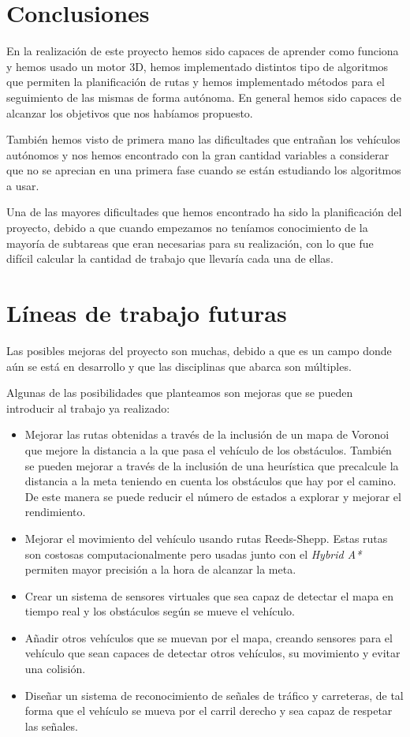 
\section{Conclusiones}
En la realización de este proyecto hemos sido capaces de aprender como funciona y hemos usado un motor 3D, hemos implementado distintos tipo de algoritmos que permiten la planificación de rutas y hemos implementado métodos para el seguimiento de las mismas de forma autónoma. En general hemos sido capaces de alcanzar los objetivos que nos habíamos propuesto.

También hemos visto de primera mano las dificultades que entrañan los vehículos autónomos y nos hemos encontrado con la gran cantidad variables a considerar que no se aprecian en una primera fase cuando se están estudiando los algoritmos a usar.

Una de las mayores dificultades que hemos encontrado ha sido la planificación del proyecto, debido a que cuando empezamos no teníamos conocimiento de la mayoría de subtareas que eran necesarias para su realización, con lo que fue difícil calcular la cantidad de trabajo que llevaría cada una de ellas.

\section{Líneas de trabajo futuras}
Las posibles mejoras del proyecto son muchas, debido a que es un campo donde aún se está en desarrollo y que las disciplinas que abarca son múltiples.

Algunas de las posibilidades que planteamos son mejoras que se pueden introducir al trabajo ya realizado:
\begin{itemize}
\item Mejorar las rutas obtenidas a través de la inclusión de un mapa de Voronoi\cite{wiki:voronoi} que mejore la distancia a la que pasa el vehículo de los obstáculos. También se pueden mejorar a través de la inclusión de una heurística que precalcule la distancia a la meta teniendo en cuenta los obstáculos que hay por el camino. De este manera se puede reducir el número de estados a explorar y mejorar el rendimiento.
\item Mejorar el movimiento del vehículo usando rutas Reeds-Shepp\cite{reeds1990optimal}. Estas rutas son costosas computacionalmente pero usadas junto con el \textit{Hybrid A*} permiten mayor precisión a la hora de alcanzar la meta.
\item Crear un sistema de sensores virtuales que sea capaz de detectar el mapa en tiempo real y los obstáculos según se mueve el vehículo.
\item Añadir otros vehículos que se muevan por el mapa, creando sensores para el vehículo que sean capaces de detectar otros vehículos, su movimiento y evitar una colisión.
\item Diseñar un sistema de reconocimiento de señales de tráfico y carreteras, de tal forma que el vehículo se mueva por el carril derecho y sea capaz de respetar las señales.
\end{itemize}
